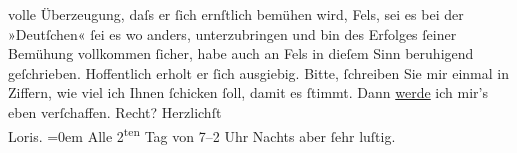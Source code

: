 \begin{ledgroupsized}[t]{13cm}
               volle Überzeugung, daſs er ſich ernſtlich bemühen wird, Fels, sei es bei der »Deutſchen« ſei es wo anders, unterzubringen und bin des Erfolges ſeiner
               Bemühung vollkommen ſicher, habe auch an Fels
               in dieſem Sinn beruhigend geſchrieben. Hoffentlich erholt er ſich ausgiebig. Bitte,
               ſchreiben Sie mir einmal in Ziffern, wie viel ich Ihnen ſchicken ſoll, damit es
               ſtimmt. Dann \uline{werde} ich mir’s eben verſchaffen.
               Recht?\pend
           \pstart
           Herzlichſt{\\[\baselineskip]}\spacefill\mbox{Loris.}\pend
           \leftskip=0em{}\pstart
           \noindent{}Alle 2\textsuperscript{ten} Tag \label{K_L00180-1v}\label{K_L00180-1h} von 7–2 Uhr Nachts aber
                  ſehr luſtig.\pend
           
         
         \endnumbering{}\end{ledgroupsized}  \newcommand{\dateiname}{L00180}\newcommand{\titel}{Hugo von Hofmannsthal an Arthur Schnitzler, 22. 2. 1893}\newcommand{\editorInnen}{ Martin Anton Müller und Gerd-Hermann Susen}
      